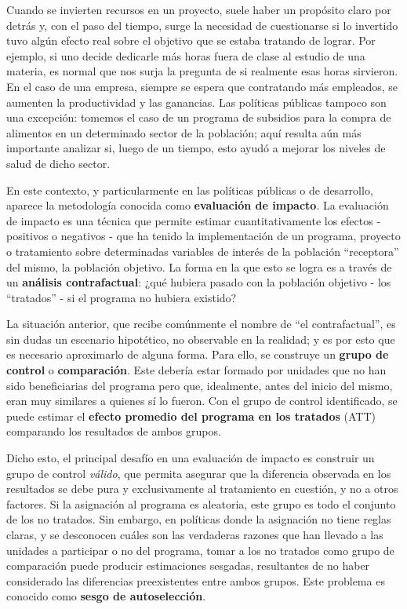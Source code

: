 \documentclass[../main.tex]{subfiles}
\begin{document}
Cuando se invierten recursos en un proyecto, suele haber un propósito claro por detrás y,
con el paso del tiempo, surge la necesidad de cuestionarse si lo invertido tuvo algún
efecto real sobre el objetivo que se estaba tratando de lograr. Por ejemplo, si uno decide
dedicarle más horas fuera de clase al estudio de una materia, es normal que nos surja la
pregunta de si realmente esas horas sirvieron. En el caso de una empresa, siempre se
espera que contratando más empleados, se aumenten la productividad y las ganancias. Las
políticas públicas tampoco son una excepción: tomemos el caso de un programa de subsidios
para la compra de alimentos en un determinado sector de la población; aquí resulta aún más
importante analizar si, luego de un tiempo, esto ayudó a mejorar los niveles de salud de
dicho sector.

En este contexto, y particularmente en las políticas públicas o de desarrollo, aparece la
metodología conocida como \textbf{evaluación de impacto}. La evaluación de impacto es una
técnica que permite estimar cuantitativamente los efectos - positivos o negativos - que ha
tenido la implementación de un programa, proyecto o tratamiento sobre determinadas
variables de interés de la población ``receptora'' del mismo, la población objetivo. La
forma en la que esto se logra es a través de un \textbf{análisis contrafactual}: ¿qué
hubiera pasado con la población objetivo - los ``tratados'' - si el programa no hubiera
existido?

La situación anterior, que recibe comúnmente el nombre de ``el contrafactual'', es sin
dudas un escenario hipotético, no observable en la realidad; y es por esto que es
necesario aproximarlo de alguna forma. Para ello, se construye un \textbf{grupo de
control} o \textbf{comparación}. Este debería estar formado por unidades que no han sido
beneficiarias del programa pero que, idealmente, antes del inicio del mismo, eran muy
similares a quienes sí lo fueron. Con el grupo de control identificado, se puede estimar
el \textbf{efecto promedio del programa en los tratados} (ATT) comparando los resultados
de ambos grupos.

Dicho esto, el principal desafío en una evaluación de impacto es construir un grupo de
control \textit{válido}, que permita asegurar que la diferencia observada en los
resultados se debe pura y exclusivamente al tratamiento en cuestión, y no a otros
factores. Si la asignación al programa es aleatoria, este grupo es todo el conjunto de los
no tratados. Sin embargo, en políticas donde la asignación no tiene reglas claras, y se
desconocen cuáles son las verdaderas razones que han llevado a las unidades a participar o
no del programa, tomar a los no tratados como grupo de comparación puede producir
estimaciones sesgadas, resultantes de no haber considerado las diferencias preexistentes
entre ambos grupos. Este problema es conocido como \textbf{sesgo de autoselección}.
\end{document}
